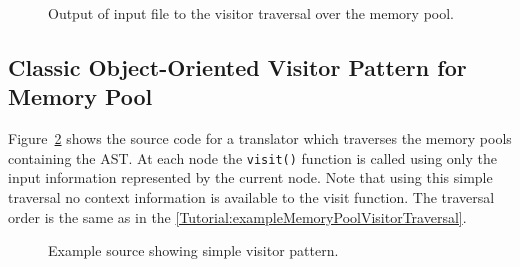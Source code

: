 \begin{figure}[!h]
{\indent
{\mySmallFontSize


\begin{latexonly}
   
\end{latexonly}

\begin{htmlonly}
   
\end{htmlonly}

}
}
\caption{Output of input file to the visitor traversal over the memory pool.}
\label{Tutorial:exampleOutput_MemoryPoolVisitorTraversal}
\end{figure}


\clearpage
\subsection{Classic Object-Oriented Visitor Pattern for Memory Pool}

Figure~\ref{Tutorial:exampleMemoryPoolVisitorPattern} shows the source code 
for a translator which traverses the memory pools containing the AST.  
At each node the {\tt visit()} function is called using only the input 
information represented by the current node.  Note that using this simple 
traversal no context information is available to the visit function. 
The traversal order is the same as in the \ref{Tutorial:exampleMemoryPoolVisitorTraversal}.

\begin{figure}[!h]
{\indent
{\mySmallFontSize


\begin{latexonly}
   
\end{latexonly}

\begin{htmlonly}
   
\end{htmlonly}

}
}
\caption{Example source showing simple visitor pattern.}
\label{Tutorial:exampleMemoryPoolVisitorPattern}
\end{figure}


